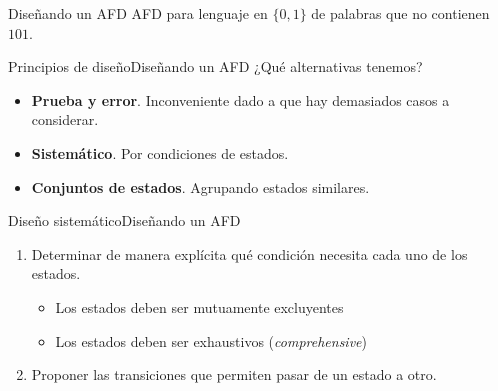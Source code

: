 \documentclass[spanish, handout]{beamer}
\newcommand\blfootnote[1]{%
  \begingroup
  \renewcommand\thefootnote{}\footnote{#1}%
  \addtocounter{footnote}{-1}%
  \endgroup
}
\begin{document}
\begin{frame}{Diseñando un AFD}
    AFD para lenguaje en $\{0, 1\}$ de palabras que no contienen $101$.

    \bigskip

    \begin{center}
    \end{center}
\end{frame}

\begin{frame}{Principios de diseño}{Diseñando un AFD}
    ¿Qué alternativas tenemos? \pause

    \begin{itemize}
        \itemsep1.5ex
        \item \textbf{Prueba y error}. Inconveniente dado a que hay demasiados casos a considerar. \pause
        \item \textbf{Sistemático}. Por condiciones de estados. \pause
        \item \textbf{Conjuntos de estados}. Agrupando estados similares.
    \end{itemize}

\end{frame}

\begin{frame}{Diseño sistemático}{Diseñando un AFD}
    \begin{enumerate}
        \itemsep1.5ex
        \item Determinar de manera explícita qué condición necesita cada uno de los estados. \pause
        \begin{itemize}
            \item Los estados deben ser mutuamente excluyentes \pause
            \item Los estados deben ser exhaustivos (\textit{comprehensive}) \pause
        \end{itemize}
        \item Proponer las transiciones que permiten pasar de un estado a otro.
    \end{enumerate}
\end{frame}
\end{document}
